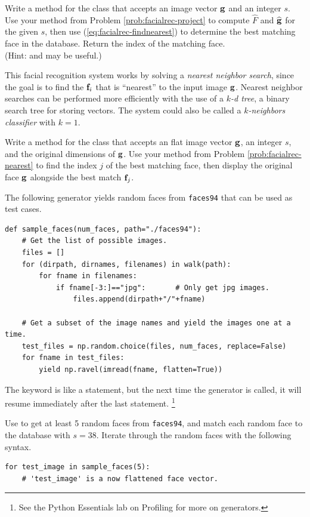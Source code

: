 \begin{problem} %
Write a method for the  class that accepts an image vector $\mathbf{g}$ and an integer $s$.
Use your method from Problem \ref{prob:facialrec-project} to compute $\widehat{F}$ and $\widehat{\mathbf{g}}$ for the given $s$, then use (\ref{eq:facialrec-findnearest}) to determine the best matching face in the database.
Return the index of the matching face.
\\(Hint:  and  may be useful.)
\label{prob:facialrec-nearest}
\end{problem}

\begin{info}
This facial recognition system works by solving a \emph{nearest neighbor search}, since the goal is to find the $\mathbf{f}_i$ that is ``nearest'' to the input image $\mathbf{g}$.
Nearest neighbor searches can be performed more efficiently with the use of a \emph{$k$-d tree}, a binary search tree for storing vectors.
The system could also be called a \emph{$k$-neighbors classifier} with $k=1$.
\end{info}

\begin{problem}
Write a method for the  class that accepts an flat image vector $\mathbf{g}$, an integer $s$, and the original dimensions of $\mathbf{g}$.
Use your method from Problem \ref{prob:facialrec-nearest} to find the index $j$ of the best matching face, then display the original face $\mathbf{g}$ alongside the best match $\mathbf{f}_j$.

The following generator yields random faces from \texttt{faces94} that can be used as test cases.
%
\begin{lstlisting}
def sample_faces(num_faces, path="./faces94"):
    # Get the list of possible images.
    files = []
    for (dirpath, dirnames, filenames) in walk(path):
        for fname in filenames:
            if fname[-3:]=="jpg":       # Only get jpg images.
                files.append(dirpath+"/"+fname)

    # Get a subset of the image names and yield the images one at a time.
    test_files = np.random.choice(files, num_faces, replace=False)
    for fname in test_files:
        yield np.ravel(imread(fname, flatten=True))
\end{lstlisting}
%
The  keyword is like a  statement, but the next time the generator is called, it will resume immediately after the last  statement.%
\footnote{See the Python Essentials lab on Profiling for more on generators.}

Use  to get at least 5 random faces from \texttt{faces94}, and match each random face to the database with $s=38$.
Iterate through the random faces with the following syntax.
%
\begin{lstlisting}
for test_image in sample_faces(5):
    # 'test_image' is a now flattened face vector.
\end{lstlisting}
\label{prob:facialrec-match}
\end{problem}

